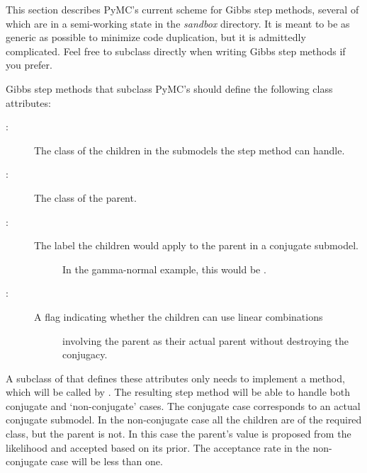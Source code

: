 \documentclass[letterpaper,10pt,english]{sphinxmanual}
\begin{document}
This section describes PyMC's current scheme for Gibbs step methods, several of which are in a semi-working state in the \emph{sandbox} directory. It is meant to be as generic as possible to minimize code duplication, but it is admittedly complicated. Feel free to subclass  directly when writing Gibbs step methods if you prefer.

Gibbs step methods that subclass PyMC's  should define the following class attributes:
\begin{description}
\item[{:}] \leavevmode
The class of the children in the submodels the step method can handle.

\item[{:}] \leavevmode
The class of the parent.

\item[{:}] \leavevmode\begin{description}
\item[{The label the children would apply to the parent in a conjugate submodel.}] \leavevmode
In the gamma-normal example, this would be .

\end{description}

\item[{:}] \leavevmode\begin{description}
\item[{A flag indicating whether the children can use linear combinations}] \leavevmode
involving the parent as their actual parent without destroying the
conjugacy.

\end{description}

\end{description}

A subclass of  that defines these attributes only needs to implement a  method, which will be called by . The resulting step method will be able to handle both conjugate and `non-conjugate' cases. The conjugate case corresponds to an actual conjugate submodel. In the non-conjugate case all the children are of the required class, but the parent is not. In this case the parent's value is proposed from the likelihood and accepted based on its prior. The acceptance rate in the non-conjugate case will be less than one.
\end{document}

